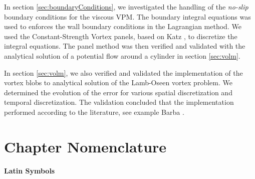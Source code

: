 In section \ref{sec:boundaryConditions}, we investigated the handling of the \emph{no-slip} boundary conditions for the viscous VPM. The boundary integral equations was used to enforces the wall boundary conditions in the Lagrangian method. We used the Constant-Strength Vortex panels, based on Katz \cite{Katz2001a}, to discretize the integral equations. The panel method was then verified and validated with the analytical solution of a potential flow around a cylinder in section \ref{sec:volm}. 

In section \ref{sec:volm}, we also verified and validated the implementation of the vortex blobs to analytical solution of the Lamb-Oseen vortex problem. We determined the evolution of the error for various spatial discretization and temporal discretization. The validation concluded that the implementation performed according to the literature, see example Barba \cite{Barba2004c}.



\section{Chapter Nomenclature}

{\textbf{\textsf{Latin Symbols}}}

